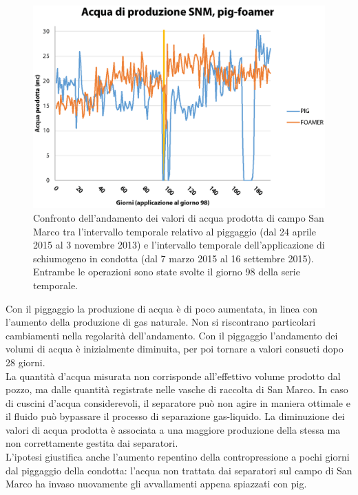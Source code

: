 \begin{figure}[htbp]
    \centering
    \includegraphics[width=\textwidth]{fig/test/graphs/pig-foamer-acqua.eps}
    \caption{Confronto dell'andamento dei valori di acqua prodotta di campo San Marco tra l'intervallo temporale relativo al piggaggio (dal 24 aprile 2015 al 3 novembre 2013) e l'intervallo temporale dell'applicazione di schiumogeno in condotta (dal 7 marzo 2015 al 16 settembre 2015). Entrambe le operazioni sono state svolte il giorno 98 della serie temporale.} 
    \label{fig:pig-foamer-acqua}
\end{figure}
Con il piggaggio la produzione di acqua è di poco aumentata, in linea con l'aumento della produzione di gas naturale. Non si riscontrano particolari cambiamenti nella regolarità dell'andamento. Con il piggaggio l'andamento dei volumi di acqua è inizialmente diminuita, per poi tornare a valori consueti dopo 28 giorni. \\
La quantità d'acqua misurata non corrisponde all'effettivo volume prodotto dal pozzo, ma dalle quantità registrate nelle vasche di raccolta di San Marco. In caso di cuscini d'acqua considerevoli, il separatore può non agire in maniera ottimale e il fluido può bypassare il processo di separazione gas-liquido. La diminuzione dei valori di acqua prodotta è associata a una maggiore produzione della stessa ma non correttamente gestita dai separatori. \\
L'ipotesi giustifica anche l'aumento repentino della contropressione a pochi giorni dal piggaggio della condotta: l'acqua non trattata dai separatori sul campo di San Marco ha invaso nuovamente gli avvallamenti appena spiazzati con pig.


